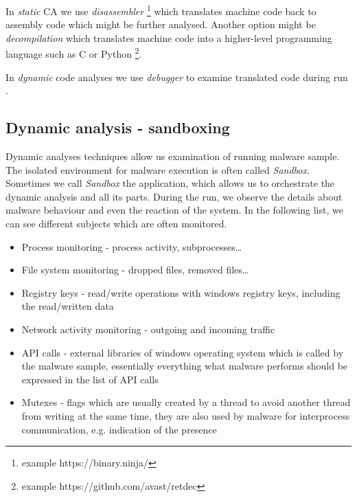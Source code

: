 In \emph{static} CA we use \emph{disassembler} \footnote{example https://binary.ninja/} which translates machine code back to assembly code which might be further analysed. Another option might be \emph{decompilation} which translates machine code into a higher-level programming language such as C or Python \footnote{example https://github.com/avast/retdec}.

In \emph{dynamic} code analyses we use \emph{debugger} to examine translated code during run \cite{KA2018}.

\subsection{Dynamic analysis - sandboxing}
Dynamic analyses techniques allow us examination of running malware sample. The isolated environment for malware execution is often called \emph{Sandbox}. Sometimes we call \emph{Sandbox} the application, which allows us to orchestrate the dynamic analysis and all its parts. During the run, we observe the details about malware behaviour and even the reaction of the system. In the following list, we can see different subjects which are often monitored.

\begin{itemize}
  \item Process monitoring - process activity, subprocesses\dots
  \item File system monitoring - dropped files, removed files\dots
  \item Registry keys - read/write operations with windows registry keys, including the read/written data
  \item Network activity monitoring - outgoing and incoming traffic
  \item API calls - external libraries of windows operating system which is called by the malware sample, essentially everything what malware performs should be expressed in the list of API calls
  \item Mutexes - flags which are usually created by a thread to avoid another thread from writing at the same time, they are also used by malware for interprocess communication, e.g. indication of the presence
\end{itemize}

